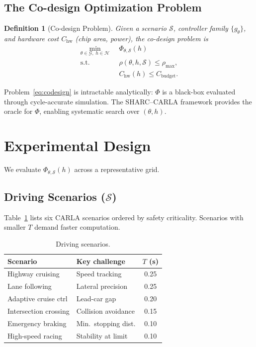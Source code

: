 \documentclass[conference]{IEEEtran}
\newcommand{\calS}{\mathcal{S}}
\newcommand{\calH}{\mathcal{H}}
\newcommand{\calG}{\mathcal{G}}
\newtheorem{definition}{Definition}
\begin{document}
\subsection{The Co-design Optimization Problem}

\begin{definition}[Co-design Problem]\label{def:codesign}
  Given a scenario $\calS$, controller family $\{g_\theta\}$, and
  hardware cost $C_\text{hw}$ (chip area, power), the
  \emph{co-design problem} is
  \begin{subequations}\label{eq:codesign}
  \begin{align}
    \min_{\theta \in \calG,\; h \in \calH}\;\;&
      \Phi_{\theta,\calS}(h) \\
    \text{s.t.}\;\;& \rho(\theta, h, \calS) \leq \rho_\text{max},\\
    & C_\text{hw}(h) \leq C_\text{budget}.
  \end{align}
  \end{subequations}
\end{definition}

Problem~\eqref{eq:codesign} is intractable analytically: $\Phi$ is a
black-box evaluated through cycle-accurate simulation.  The
SHARC--CARLA framework provides the oracle for $\Phi$, enabling
systematic search over $(\theta, h)$.

\section{Experimental Design}\label{sec:experiments}

We evaluate $\Phi_{\theta,\calS}(h)$ across a representative grid.

\subsection{Driving Scenarios ($\calS$)}

Table~\ref{tab:scenarios} lists six CARLA scenarios ordered by safety
criticality.  Scenarios with smaller $T$ demand faster computation.

\begin{table}[ht]
  \centering
  \caption{Driving scenarios.}
  \label{tab:scenarios}
  \footnotesize
  \renewcommand{\arraystretch}{1.15}
  \begin{tabular}{lp{2.5cm}c}
    \toprule
    \textbf{Scenario} & \textbf{Key challenge}
      & $T$ (s) \\
    \midrule
    Highway cruising       & Speed tracking        & 0.25 \\
    Lane following         & Lateral precision      & 0.25 \\
    Adaptive cruise ctrl   & Lead-car gap           & 0.20 \\
    Intersection crossing  & Collision avoidance    & 0.15 \\
    Emergency braking      & Min.\ stopping dist.   & 0.10 \\
    High-speed racing      & Stability at limit     & 0.10 \\
    \bottomrule
  \end{tabular}
\end{table}
\end{document}
